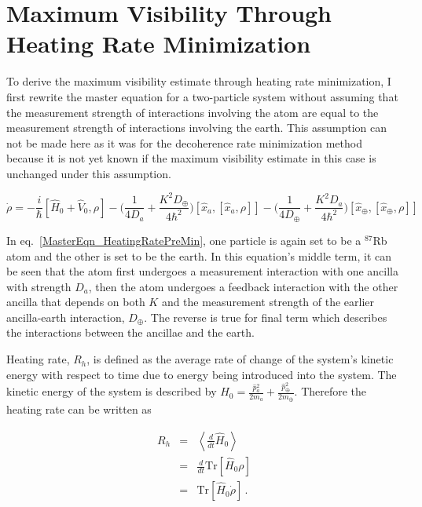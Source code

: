 \documentclass[aps, prd, superscriptaddress,twocolumn,amsmath,amssymb,nofootinbib]{revtex4-1}
\newcommand{\beq}{\begin{equation}}
\newcommand{\eeq}{\end{equation}}
\newcommand{\h}[1]{\hat#1{}}
\begin{document}

\section{Maximum Visibility Through Heating Rate Minimization}

To derive the maximum visibility estimate through heating rate minimization, I first rewrite the master equation for a two-particle system without assuming that the measurement strength of interactions involving the atom are equal to the measurement strength of interactions involving the earth. This assumption can not be made here as it was for the decoherence rate minimization method because it is not yet known if the maximum visibility estimate in this case is unchanged under this assumption.

\beq
 \dot{\rho} = -\frac{i}{\hbar}[\h H_0+ \h V_0, \rho] 
 -\bigg(\frac{1}{4D_a}+\frac{K^2D_\oplus}{4\hbar^2}\bigg)[\h x_a, [\h x_a,\rho]]
  -\bigg(\frac{1}{4D_\oplus}+\frac{K^2D_a}{4\hbar^2}\bigg)[\h x_\oplus, [\h x_\oplus,\rho]]
 \label{MasterEqn_HeatingRatePreMin}
 \eeq

In eq.~\eqref{MasterEqn_HeatingRatePreMin}, one particle is again set to be a $^{87}$Rb atom and the other is set to be the earth. In this equation's middle term, it can be seen that the atom first undergoes a measurement interaction with one ancilla with strength $D_a$, then the atom undergoes a feedback interaction with the other ancilla that depends on both $K$ and the measurement strength of the earlier ancilla-earth interaction, $D_\oplus$. The reverse is true for final term which describes the interactions between the ancillae and the earth.
 
Heating rate, $R_h$, is defined as the average rate of change of the system's kinetic energy with respect to time due to energy being introduced into the system. The kinetic energy of the system is described by $\h H_0 = \frac{\h p_a^2}{2m_a} + \frac{\h p_\oplus^2}{2m_\oplus}$. Therefore the heating rate can be written as

\begin{eqnarray}
R_h &=& \left\langle \frac{d}{dt} \h H_0 \right\rangle \nonumber \\
&=& \frac{d}{dt} \text{Tr} \left\lbrack  \h H_0 \rho \right\rbrack \nonumber \\
&=& \text{Tr} \left\lbrack \h H_0 \dot \rho \right\rbrack \,. \label{defhrate}
\label{MasterEqn_HeatingRatePreMin}
\end{eqnarray}
\end{document}
